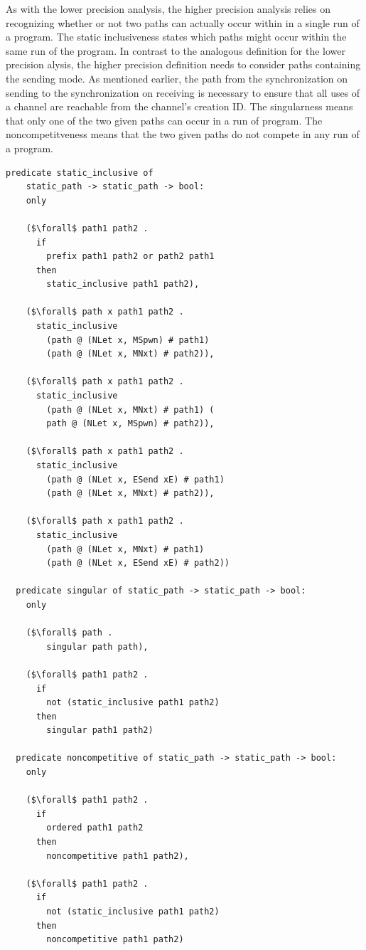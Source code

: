 \documentclass{article}
\begin{document}
As with the lower precision analysis, the higher precision analysis relies on recognizing
whether or not two paths can actually occur within in a single run of a program. The static
inclusiveness states which paths might occur within the same run of the program.
In contrast to the analogous definition for the lower precision
alysis, the higher precision definition needs to consider paths containing the
sending mode.  As mentioned earlier, the path from the synchronization on sending to the
synchronization on receiving is necessary to ensure that all uses of a channel are reachable
from the channel's creation ID.  The singularness means that only one of the two
given paths can occur in a run of program.  The noncompetitveness means that the two
given paths do not compete in any run of a program. 

\begin{lstlisting}[language=logic, mathescape]
  predicate static_inclusive of
    static_path -> static_path -> bool:
    only

    ($\forall$ path1 path2 .
      if
        prefix path1 path2 or path2 path1
      then
        static_inclusive path1 path2),

    ($\forall$ path x path1 path2 .
      static_inclusive
        (path @ (NLet x, MSpwn) # path1)
        (path @ (NLet x, MNxt) # path2)),

    ($\forall$ path x path1 path2 .
      static_inclusive
        (path @ (NLet x, MNxt) # path1) (
        path @ (NLet x, MSpwn) # path2)),

    ($\forall$ path x path1 path2 .
      static_inclusive
        (path @ (NLet x, ESend xE) # path1)
        (path @ (NLet x, MNxt) # path2)),

    ($\forall$ path x path1 path2 .
      static_inclusive
        (path @ (NLet x, MNxt) # path1)
        (path @ (NLet x, ESend xE) # path2))

  predicate singular of static_path -> static_path -> bool:
    only 

    ($\forall$ path .
        singular path path),

    ($\forall$ path1 path2 .
      if
        not (static_inclusive path1 path2)
      then
        singular path1 path2)

  predicate noncompetitive of static_path -> static_path -> bool:
    only

    ($\forall$ path1 path2 . 
      if
        ordered path1 path2
      then
        noncompetitive path1 path2),

    ($\forall$ path1 path2 .
      if
        not (static_inclusive path1 path2)
      then
        noncompetitive path1 path2)
  \end{lstlisting}
\end{document}
